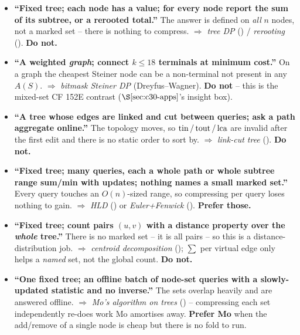 \begin{itemize}[leftmargin=1.4em]
  \item \textbf{``Fixed tree; each node has a value; for every node report the sum of
        its subtree, or a rerooted total.''} The answer is defined on \emph{all} \(n\)
        nodes, not a marked set -- there is nothing to compress. \(\Rightarrow\) \emph{tree
        DP} () / \emph{rerooting} (). \textbf{Do not.}
  \item \textbf{``A weighted \emph{graph}; connect \(k\le18\) terminals at minimum cost.''}
        On a graph the cheapest Steiner node can be a non-terminal not present in any
        \(A(S)\). \(\Rightarrow\) \emph{bitmask Steiner DP} (Dreyfus--Wagner). \textbf{Do
        not} -- this is the mixed-set CF 152E contrast (\(\secref{c30-apps}\)'s insight box).
  \item \textbf{``A tree whose edges are linked and cut between queries; ask a path
        aggregate online.''} The topology moves, so \(\operatorname{tin}/\operatorname{tout}/\operatorname{lca}\) are invalid after
        the first edit and there is no static order to sort by. \(\Rightarrow\)
        \emph{link-cut tree} (). \textbf{Do not.}
  \item \textbf{``Fixed tree; many queries, each a whole path or whole subtree range
        sum/min with updates; nothing names a small marked set.''} Every query touches an
        \(O(n)\)-sized range, so compressing per query loses nothing to gain.
        \(\Rightarrow\) \emph{HLD} () or \emph{Euler+Fenwick} ().
        \textbf{Prefer those.}
  \item \textbf{``Fixed tree; count pairs \((u,v)\) with a distance property over the
        \emph{whole} tree.''} There is no marked set -- it is all pairs -- so this is a
        distance-distribution job. \(\Rightarrow\) \emph{centroid decomposition}
        (); \(\sum\) per virtual edge only helps a \emph{named} set, not the
        global count. \textbf{Do not.}
  \item \textbf{``One fixed tree; an offline batch of node-set queries with a slowly-updated
        statistic and no inverse.''} The sets overlap heavily and are answered offline.
        \(\Rightarrow\) \emph{Mo's algorithm on trees} () -- compressing each set
        independently re-does work Mo amortises away. \textbf{Prefer Mo} when the add/remove
        of a single node is cheap but there is no fold to run.
\end{itemize}


